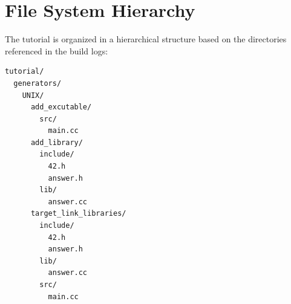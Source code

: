 \section{File System Hierarchy}
The tutorial is organized in a hierarchical structure based on the directories referenced in the build logs:

\begin{verbatim}
tutorial/
  generators/
    UNIX/
      add_excutable/
        src/
          main.cc
      add_library/
        include/
          42.h
          answer.h
        lib/
          answer.cc
      target_link_libraries/
        include/
          42.h
          answer.h
        lib/
          answer.cc
        src/
          main.cc
\end{verbatim}

